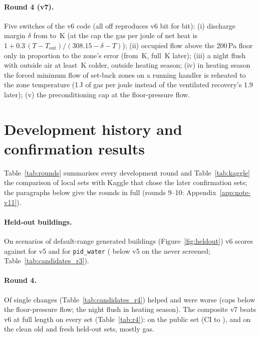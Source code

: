 \documentclass{article}
\begin{document}
\paragraph{Round 4 (v7).}
\label{sec:v7}
Five switches of the v6 code (all off reproduces v6 bit for bit): (i) discharge margin $\delta$ from
\VSixDischMargin{} to \ParRFDischMargin\,K (at the cap the gas per joule of net heat is
$1 + 0.3\,(T - T_{\text{out}})/(308.15 - \delta - T)$); (ii) occupied flow above the 200\,Pa floor only in
proportion to the zone's error (from \ParRFOccEzero\,K, full \ParRFOccSpan\,K later); (iii) a night flush with
outside air at least \ParRFFlushDt\,K colder, outside heating season; (iv) in heating season the forced minimum
flow of set-back zones on a running handler is reheated to the zone temperature (1\,J of gas per joule instead
of the ventilated recovery's 1.9 later); (v) the preconditioning cap at the floor-pressure flow.

\section{Development history and confirmation results}
\label{app:rounds}
Table~\ref{tab:rounds} summarises every development round and Table~\ref{tab:kaggle} the comparison of local sets with Kaggle that chose the later confirmation sets; the paragraphs below give the rounds in full (rounds 9--10: Appendix~\ref{app:note-v11}).



\paragraph{Held-out buildings.}
On \NHeldAll{} scenarios of \NHeldAllBuild{} default-range generated buildings (Figure~\ref{fig:heldout}) v6 scores
\HeldAllMetricOurs{} against \HeldAllMetricOursVFive{} for v5 and \HeldAllMetricPidWater{} for \texttt{pid\_water}
(\HeldUnscrVFiveRelRed{} below v5 on the \NHeldUnscr{} never screened; Table~\ref{tab:candidates_r3}).

\paragraph{Round 4.}
Of \RFNSingles{} single changes (Table~\ref{tab:candidates_r4}) \RFNHelps{} helped and \RFNWorse{} were worse (caps
below the floor-pressure flow; the night flush in heating season). The composite v7 beats v6 at full length on every
set (Table~\ref{tab:r4}): \RFConfPubRed{} on the public set (CI \RFConfPubRedLo{} to \RFConfPubRedHi),
\RFConfOldCleanRed{} and \RFConfFreshRed{} on the clean old and fresh held-out sets, mostly gas.
\end{document}
